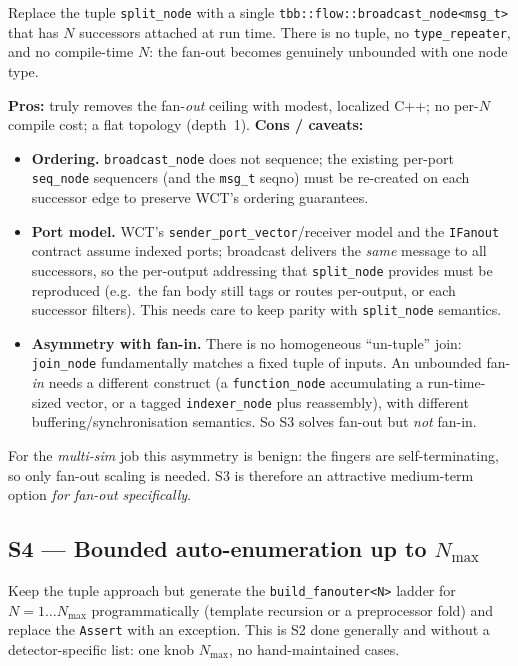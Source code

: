 \documentclass[11pt]{article}
\newcommand{\code}[1]{\texttt{#1}}
\begin{document}
Replace the tuple \code{split\_node} with a single
\code{tbb::flow::broadcast\_node<msg\_t>} that has $N$ successors attached at
run time.  There is no tuple, no \code{type\_repeater}, and no compile-time $N$:
the fan-out becomes genuinely unbounded with one node type.

\textbf{Pros:} truly removes the fan-\emph{out} ceiling with modest, localized
C++; no per-$N$ compile cost; a flat topology (depth~1).
\textbf{Cons / caveats:}
\begin{itemize}
\item \textbf{Ordering.}  \code{broadcast\_node} does not sequence; the existing
  per-port \code{seq\_node} sequencers (and the \code{msg\_t} seqno) must be
  re-created on each successor edge to preserve WCT's ordering guarantees.
\item \textbf{Port model.}  WCT's \code{sender\_port\_vector}/receiver model and
  the \code{IFanout} contract assume indexed ports; broadcast delivers the
  \emph{same} message to all successors, so the per-output addressing that
  \code{split\_node} provides must be reproduced (e.g.\ the fan body still tags
  or routes per-output, or each successor filters).  This needs care to keep
  parity with \code{split\_node} semantics.
\item \textbf{Asymmetry with fan-in.}  There is no homogeneous ``un-tuple'' join:
  \code{join\_node} fundamentally matches a fixed tuple of inputs.  An unbounded
  fan-\emph{in} needs a different construct (a \code{function\_node} accumulating
  a run-time-sized vector, or a tagged \code{indexer\_node} plus reassembly),
  with different buffering/synchronisation semantics.  So S3 solves fan-out but
  \emph{not} fan-in.
\end{itemize}

\noindent
For the \emph{multi-sim} job this asymmetry is benign: the fingers are
self-terminating, so only fan-out scaling is needed.  S3 is therefore an
attractive medium-term option \emph{for fan-out specifically}.

\subsection{S4 --- Bounded auto-enumeration up to \texorpdfstring{$N_{\max}$}{Nmax}}

Keep the tuple approach but generate the \code{build\_fanouter<N>} ladder for
$N=1\ldots N_{\max}$ programmatically (template recursion or a preprocessor
fold) and replace the \code{Assert} with an exception.  This is S2 done
generally and without a detector-specific list: one knob $N_{\max}$, no
hand-maintained cases.
\end{document}
